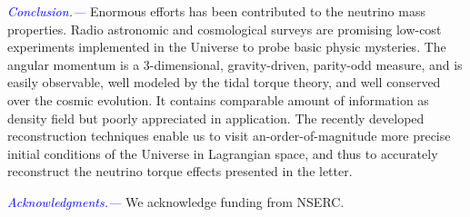 \documentclass[aps,prd,twocolumn,amsmath,amssymb,amsfont,superscriptaddress]{revtex4-1}
\newcommand{\tcb}{\textcolor{blue}}
\begin{document}

\tcb{\textit{Conclusion.---}} 
Enormous efforts has been contributed to the neutrino mass properties.
Radio astronomic and cosmological surveys are promising low-cost experiments implemented in the Universe to probe basic physic mysteries. 
The angular momentum is a 3-dimensional, gravity-driven, parity-odd measure, 
and is easily observable, well modeled by the tidal torque theory, and well conserved over the cosmic evolution.
It contains comparable amount of information as density field but poorly appreciated in application.
The recently developed reconstruction techniques enable us to visit an-order-of-magnitude more precise initial conditions of the Universe in Lagrangian space, 
and thus to accurately reconstruct the neutrino torque effects presented in the letter.

\tcb{\textit{Acknowledgments.---}}
We acknowledge funding from NSERC.



%
\end{document}
